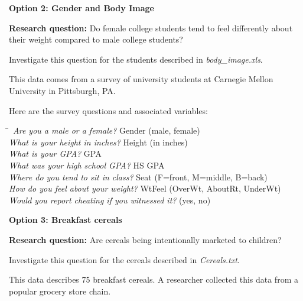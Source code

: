 \newpage
\textbf{Option 2: Gender and Body Image} 

\textbf{Research question:} Do female college students tend to feel differently about their weight compared to male college students? 

Investigate this question for the students described in \emph{body\_image.xls}. 

This data comes from a survey of university students at Carnegie Mellon University in Pittsburgh, PA.

Here are the survey questions and associated variables: 
\begin{tabbing}
\hspace*{3.5in}\=\kill\
\emph{Are you a male or a female?}\> Gender (male, female)\\
\emph{What is your height in inches?}\> Height (in inches)\\
\emph{What is your GPA?}\> GPA\\
\emph{What was your high school GPA?}\> HS GPA\\
\emph{Where do you tend to sit in class?}\> Seat (F=front, M=middle, B=back)\\
\emph{How do you feel about your weight?}\> WtFeel (OverWt, AboutRt, UnderWt)\\
\emph{Would you report cheating if you witnessed it?}\> (yes, no)
\end{tabbing}
\bigskip
\textbf{Option 3: Breakfast cereals} 

\textbf{Research question:} Are cereals being intentionally marketed to children?

Investigate this question for the cereals described in \emph{Cereals.txt}. 

This data describes 75 breakfast cereals. A researcher collected this data from a popular grocery store chain.

